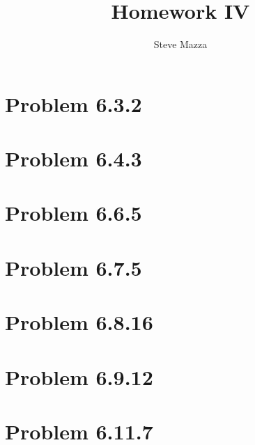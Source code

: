 \documentclass[letterpaper,10pt]{article}
\title{Homework IV}
\author{Steve Mazza}
\begin{document}
\maketitle

\section*{Problem 6.3.2}

\section*{Problem 6.4.3}

\section*{Problem 6.6.5}

\section*{Problem 6.7.5}

\section*{Problem 6.8.16}

\section*{Problem 6.9.12}

\section*{Problem 6.11.7}
\end{document}
